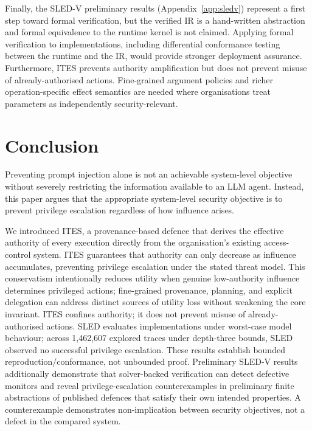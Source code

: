 \documentclass{article}
\begin{document}
Finally, the SLED-V preliminary results (Appendix~\ref{app:sledv})
represent a first step toward formal verification, but the verified IR is a
hand-written abstraction and formal equivalence to the runtime kernel is not
claimed. Applying formal verification to implementations, including
differential conformance testing between the runtime and the IR, would provide
stronger deployment assurance. Furthermore, ITES prevents authority
amplification but does not prevent misuse of already-authorised actions.
Fine-grained argument policies and richer operation-specific effect semantics
are needed where organisations treat parameters as independently
security-relevant.

\section{Conclusion}
\label{sec:conclusion}

Preventing prompt injection alone is not an achievable system-level objective
without severely restricting the information available to an LLM agent. Instead,
this paper argues that the appropriate system-level security objective is to
prevent privilege escalation regardless of how influence arises.

We introduced ITES, a provenance-based defence that derives the effective
authority of every execution directly from the organisation's existing
access-control system. ITES guarantees that authority can only decrease as
influence accumulates, preventing privilege escalation under the stated threat
model. This conservatism intentionally reduces utility when genuine
low-authority influence determines privileged actions; fine-grained
provenance, planning, and explicit delegation can address distinct sources of
utility loss without weakening the core invariant. ITES confines authority;
it does not prevent misuse of already-authorised actions. SLED evaluates implementations under
worst-case model behaviour; across 1{,}462{,}607 explored traces under
depth-three bounds,
SLED observed no successful privilege escalation. These results establish
bounded reproduction/conformance, not unbounded proof. Preliminary SLED-V results
additionally demonstrate that solver-backed verification can detect defective
monitors and reveal privilege-escalation counterexamples in preliminary
finite abstractions of published defences that satisfy their own
intended properties. A counterexample demonstrates non-implication between
security objectives, not a defect in the compared system.
\end{document}
